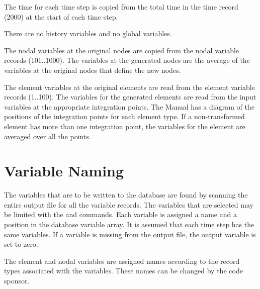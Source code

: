 The time for each time step is copied from the total time in the
 time record (2000) at the start of each time step. 


There are no history variables and no global variables.

The nodal variables at the original nodes are copied from the
 nodal variable records (101..1000). The variables at the
generated nodes are the average of the variables at the original nodes
that define the new nodes.

The element variables at the original elements are read from the
 element variable records (1..100). The variables for the
generated elements are read from the input variables at the appropriate
integration points. The  Manual has a diagram of the
positions of the integration points for each element type. If a
non-transformed element has more than one integration point, the
variables for the element are averaged over all the points.

\section{Variable Naming} \label{trans:varnam}

The variables that are to be written to the  database are
found by scanning the entire  output file for all the variable
records. The variables that are selected may be limited with the
 and  commands. Each variable is assigned a name
and a position in the  database variable array. It is
assumed that each time step has the same variables. If a variable is
missing from the  output file, the output variable is set to
zero.

The element and nodal variables are assigned names according to the
record types associated with the variables. These names can be changed
by the code sponsor.

